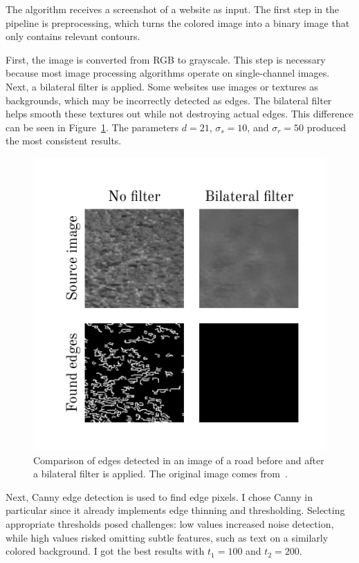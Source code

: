 \documentclass[
  digital,     %
  oneside,     %
  nosansbold,  %
  nocolorbold, %
  lof,         %
  lot,         %
]{fithesis4}
\begin{document}
The algorithm receives a screenshot of a website as input. The first step in the pipeline is preprocessing, which turns the colored image into a binary image that only contains relevant contours.

First, the image is converted from RGB to grayscale. This step is necessary because most image processing algorithms operate on single-channel images. Next, a bilateral filter is applied. Some websites use images or textures as backgrounds, which may be incorrectly detected as edges. The bilateral filter helps smooth these textures out while not destroying actual edges. This difference can be seen in Figure~\ref{fig:bilateral}. The parameters $d=21$, $\sigma_s =10$, and $\sigma_r = 50$ produced the most consistent results.

\begin{figure}
    \centering
    \includegraphics[width=1\linewidth]{diagrams/bilateral.pdf}
    \caption{Comparison of edges detected in an image of a road before and after a bilateral filter is applied. The original image comes from~\cite{aydos2020}.}
    \label{fig:bilateral}
\end{figure}

Next, Canny edge detection is used to find edge pixels. I chose Canny in particular since it already implements edge thinning and thresholding. Selecting appropriate thresholds posed challenges: low values increased noise detection, while high values risked omitting subtle features, such as text on a similarly colored background. I got the best results with $t_1=100$ and $t_2=200$.
\end{document}
